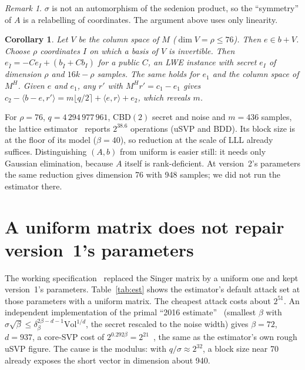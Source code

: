 \documentclass[11pt]{article}
\newtheorem{corollary}{Corollary}
\theoremstyle{remark}
\newtheorem{remark}{Remark}
\begin{document}
\begin{remark}
$\sigma$ is not an automorphism of the sedenion product, so the ``symmetry'' of $A$ is a relabelling of coordinates. The
argument above uses only linearity.
\end{remark}

\begin{corollary}
Let $V$ be the column space of $M$ ($\dim V=\rho\le76$). Then $e\in b+V$. Choose $\rho$ coordinates $I$ on which a basis
of $V$ is invertible. Then $e_{\bar I}=-C e_I+(b_{\bar I}+C b_I)$ for a public $C$, an LWE instance with secret $e_I$ of
dimension $\rho$ and $16k-\rho$ samples. The same holds for $e_1$ and the column space of $M^{H}$. Given $e$ and $e_1$, any
$r'$ with $M^{H}r'=c_1-e_1$ gives $c_2-\langle b-e,r'\rangle=m\lfloor q/2\rceil+\langle e,r\rangle+e_2$, which reveals $m$.
\end{corollary}

For $\rho=76$, $q=4\,294\,977\,961$, CBD$(2)$ secret and noise and $m=436$ samples, the lattice
estimator~\cite{APS15,estimator} reports $2^{38.6}$ operations (uSVP and BDD). Its block size is at the floor of its
model ($\beta=40$), so reduction at the scale of LLL already suffices. Distinguishing $(A,b)$ from uniform is easier
still: it needs only Gaussian elimination, because $A$ itself is rank-deficient. At version~2's parameters the same
reduction gives dimension 76 with 948 samples; we did not run the estimator there.

\section{A uniform matrix does not repair version~1's parameters}\label{sec:uniform}

The working specification~\cite{Gif26b} replaced the Singer matrix by a uniform one and kept version~1's parameters.
Table~\ref{tab:est} shows the estimator's default attack set at those parameters with a uniform matrix. The cheapest
attack costs about $2^{51}$. An
independent implementation of the primal ``2016 estimate''~\cite{ADPS16} (smallest $\beta$ with
$\sigma\sqrt\beta\le\delta_\beta^{2\beta-d-1}\mathrm{Vol}^{1/d}$, the secret rescaled to the noise width) gives $\beta=72$,
$d=937$, a core-SVP cost of $2^{0.292\beta}=2^{21}$~\cite{BDGL16}, the same as the estimator's own rough uSVP figure.
The cause is the modulus: with $q/\sigma\approx2^{32}$, a block size near 70 already exposes the short vector in
dimension about 940.
\end{document}
